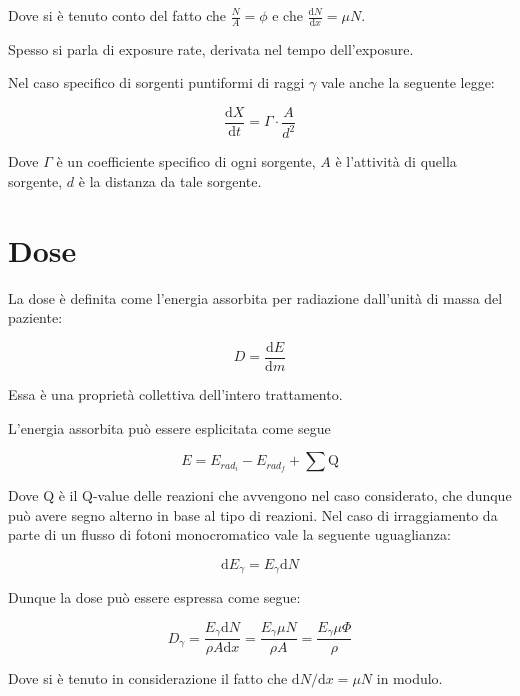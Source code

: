 Dove si è tenuto conto del fatto che $\frac{N}{A}=\phi$ e che $\frac{\mathrm{d}N}{\mathrm{d}x}=\mu N$.

Spesso si parla di exposure rate, derivata nel tempo dell'exposure.

Nel caso specifico di sorgenti puntiformi di raggi $\gamma$ vale anche la seguente legge:

\begin{equation}
\frac{\mathrm{d}X}{\mathrm{d}t}=\Gamma\cdot\frac{A}{d^2}
\end{equation}

Dove $\Gamma$ è un coefficiente specifico di ogni sorgente, $A$ è l'attività di quella sorgente, $d$ è la distanza da tale sorgente.

\section{Dose}

La dose è definita come l'energia assorbita per radiazione dall'unità di massa del paziente:

\begin{equation}
D=\frac{\mathrm{d}E}{\mathrm{d}m}
\end{equation}

Essa è una proprietà collettiva dell'intero trattamento.

L'energia assorbita può essere esplicitata come segue

\begin{equation}
E=E_{rad_{i}}-E_{rad_{f}}+\sum \text{Q}
\end{equation}

Dove Q è il Q-value delle reazioni che avvengono nel caso considerato, che dunque può avere segno alterno in base al tipo di reazioni. Nel caso di irraggiamento da parte di un flusso di fotoni monocromatico vale la seguente uguaglianza:

\begin{equation}
\mathrm{d}E_{\gamma}=E_{\gamma}\mathrm{d}N
\end{equation}

Dunque la dose può essere espressa come segue:

\begin{equation}
D_{\gamma}=\frac{E_{\gamma}\mathrm{d}N}{\rho A\mathrm{d}x}=\frac{E_{\gamma}\mu N}{\rho A}=\frac{E_{\gamma}\mu \Phi}{\rho} 
\end{equation}

Dove si è tenuto in considerazione il fatto che $\mathrm{d}N/\mathrm{d}x=\mu N$ in modulo.

